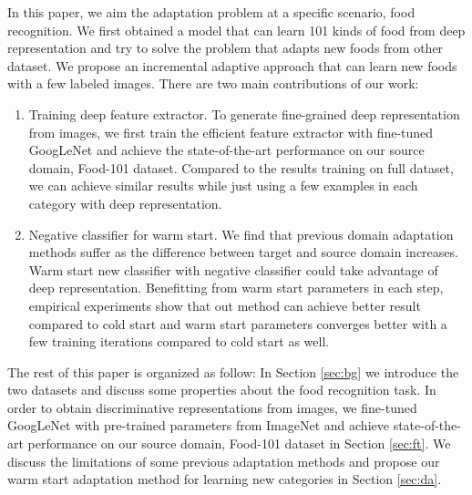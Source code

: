 In this paper, we aim the adaptation problem at a specific scenario, food recognition. We first obtained a model that can learn 101 kinds of food from deep representation and try to solve the problem that adapts new foods from other dataset. We propose an incremental adaptive approach that can learn new foods with a few labeled images. There are two main contributions of our work:
\begin{enumerate}
  \item Training deep feature extractor. To generate fine-grained deep representation from images, we first train the efficient feature extractor with fine-tuned GoogLeNet and achieve the state-of-the-art performance on our source domain, Food-101 dataset. Compared to the results training on full dataset, we can achieve similar results while just using a few examples in each category with deep representation.
  \item Negative classifier for warm start. We find that previous domain adaptation methods suffer as the difference between target and source domain increases. Warm start new classifier with negative classifier could take advantage of deep representation. Benefitting from warm start parameters in each step, empirical experiments show that out method can achieve better result compared to cold start and warm start parameters converges better with a few training iterations compared to cold start as well.
\end{enumerate}

The rest of this paper is organized as follow: In Section \ref{sec:bg} we introduce the two datasets and discuss some properties about the food recognition task. In order to obtain discriminative representations from images, we fine-tuned GoogLeNet with pre-trained parameters from ImageNet and achieve state-of-the-art performance on our source domain, Food-101 dataset in Section \ref{sec:ft}. We discuss the limitations of some previous adaptation methods and propose our warm start adaptation method for learning new categories in Section \ref{sec:da}.
